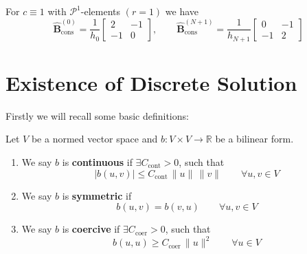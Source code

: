 \begin{example}
    For $c\equiv 1$ with $\mathcal{P}^1$-elements $(r=1)$ we have 
    \begin{equation*}
        \widehat{\textbf{B}}_{\text{cons}}^{(0)} = \frac{1}{h_0}
        \begin{bmatrix}
            2 & -1 \\
            -1 & 0
        \end{bmatrix}
        ,\qquad 
        \widehat{\textbf{B}}_{\text{cons}}^{(N+1)} = \frac{1}{h_{N+1}}
        \begin{bmatrix}
            0 & -1 \\
            -1 & 2
        \end{bmatrix}
    \end{equation*}
\end{example}

\section{Existence of Discrete Solution}
\label{sec:existence_uniqueness_elliptic_discrete_problem}
Firstly we will recall some basic definitions:
\begin{definition} Let $V$ be a normed vector space and $b:V\times V \to \mathbb{R}$
    be a bilinear form.
    \begin{enumerate}[label=\textnormal{(\roman*)}]
        \item We say $b$ is \textbf{continuous} if $\exists C_{\text{cont}}>0$, such that
        \[
            |b(u,v)|\leq C_{\text{cont}}\, \|u\|\, \|v\| \qquad \forall u,v \in V
        \]
        \item We say $b$ is \textbf{symmetric} if 
        \[  
            b(u,v) = b(v,u) \qquad \forall u,v \in V
        \]
        \item We say $b$ is \textbf{coercive} if $\exists C_{\text{coer}}>0$, such that
        \[
            b(u,u)\geq C_{\text{coer}}\, \|u\|^2 \qquad \forall u \in V
        \]
    \end{enumerate}
\end{definition}


